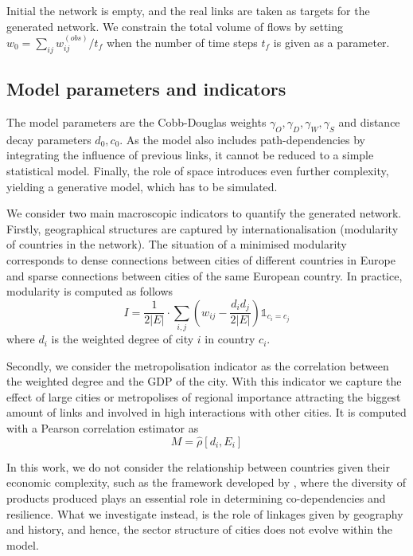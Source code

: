 \documentclass[10pt,letterpaper]{article}
\begin{document}
Initial the network is empty, and the real links are taken as targets for the generated network. We constrain the total volume of flows by setting $w_0 = \sum_{ij} w_{ij}^{(obs)} / t_{f}$ when the number of time steps $t_f$ is given as a parameter.

\subsection*{Model parameters and indicators}

The model parameters are the Cobb-Douglas weights $\gamma_O,\gamma_D,\gamma_W,\gamma_S$ and distance decay parameters $d_0,c_0$. As the model also includes path-dependencies by integrating the influence of previous links, it cannot be reduced to a simple statistical model. Finally, the role of space introduces even further complexity, yielding a generative model, which has to be simulated.

We consider two main macroscopic indicators to quantify the generated network. Firstly, geographical structures are captured by internationalisation (modularity of countries in the network). The situation of a minimised modularity corresponds to dense connections between cities of different countries in Europe and sparse connections between cities of the same European country. In practice, modularity is computed as follows
\begin{equation}
    I = \frac{1}{2 \left|E\right|} \cdot \sum_{i,j} \left(w_{ij} - \frac{d_i d_j}{2 \left|E\right|}\right) \mathbb{1}_{c_i = c_j}
\end{equation}
where $d_i$ is the weighted degree of city $i$ in country $c_i$.

Secondly, we consider the metropolisation indicator as the correlation between the weighted degree and the GDP of the city. With this indicator we capture the effect of large cities or metropolises of regional importance attracting the biggest amount of links and involved in high interactions with other cities. It is computed with a Pearson correlation estimator as
\begin{equation}
    M = \hat{\rho} \left[d_i , E_i \right]
\end{equation}

In this work, we do not consider the relationship between countries given their economic complexity, such as the framework developed by  \cite{hidalgo2007product}, where the diversity of products produced plays an essential role in determining co-dependencies and resilience.
What we investigate instead, is the role of linkages given by geography and history, and hence, the sector structure of cities does not evolve within the model.
\end{document}

